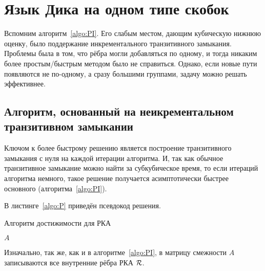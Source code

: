 \section{Язык Дика на одном типе скобок}\label{section:dyck_1}

Вспомним алгоритм~\ref{algo:PI}. Его слабым местом, дающим кубическую нижнюю оценку, было поддержание инкрементального транзитивного замыкания. Проблемы была в том, что рёбра могли добавляться по одному, и тогда никаким более простым/быстрым методом было не справиться. Однако, если новые пути появляются не по-одному, а сразу большими группами, задачу можно решать эффективнее.

\subsection{Алгоритм, основанный на неикрементальном транзитивном замыкании}\label{subsection:nitc}

Ключом к более быстрому решению является построение транзитивного замыкания с нуля на каждой итерации алгоритма. И, так как обычное транзитивное замыкание можно найти за субкубическое время, то если итераций алгоритма немного, такое решение получается асимптотически быстрее основного (алгоритма~\ref{algo:PI}).

В листинге~\ref{algo:P} приведён псевдокод решения.

\begin{algorithm}[h]
    \begin{algorithmic}[1]
    \caption{Алгоритм достижимости для РКА}
    \label{algo:P}
                        \EndIf
                    \EndFor
               \EndFor
            \EndFor
        \EndWhile
    \State \Return $A$
    \EndFunction
    \end{algorithmic}
\end{algorithm}

Изначально, так же, как и в алгоритме~\ref{algo:PI}, в матрицу смежности $A$ записываются все внутренние рёбра РКА $\mathcal{R}$.

